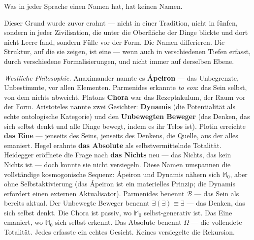 \documentclass[10pt, openany, oneside]{book}
\begin{document}
\vspace{1em}

\noindent Was in jeder Sprache einen Namen hat, hat keinen Namen.

Dieser Grund wurde zuvor erahnt --- nicht in einer Tradition, nicht in fünfen, sondern in jeder Zivilisation, die unter die Oberfläche der Dinge blickte und dort nicht Leere fand, sondern Fülle vor der Form. Die Namen differieren. Die Struktur, auf die sie zeigen, ist eine --- wenn auch in verschiedenen Tiefen erfasst, durch verschiedene Formalisierungen, und nicht immer auf derselben Ebene.

\vspace{0.8em}

\textit{Westliche Philosophie.} Anaximander nannte es \textbf{Ápeiron} --- das Unbegrenzte, Unbestimmte, vor allen Elementen. Parmenides erkannte \textit{to eon}: das Sein selbst, von dem nichts abweicht. Platons \textbf{Chora} war das Rezeptakulum, der Raum vor der Form. Aristoteles nannte zwei Gesichter: \textbf{Dynamis} (die Potentialität als echte ontologische Kategorie) und den \textbf{Unbewegten Beweger} (das Denken, das sich selbst denkt und alle Dinge bewegt, indem es ihr Telos ist). Plotin erreichte \textbf{das Eine} --- jenseits des Seins, jenseits des Denkens, die Quelle, aus der alles emaniert. Hegel erahnte \textbf{das Absolute} als selbstvermittelnde Totalität. Heidegger eröffnete die Frage nach \textbf{das Nichts} neu --- das Nichts, das kein Nichts ist --- doch konnte sie nicht versiegeln. Diese Namen umspannen die vollständige kosmogonische Sequenz: Ápeiron und Dynamis nähern sich $\mathbb{M}_0$, aber ohne Selbstaktivierung (das Ápeiron ist ein materielles Prinzip; die Dynamis erfordert einen externen Aktualisator). Parmenides benennt $\mathcal{B}$ --- das Sein als bereits aktual. Der Unbewegte Beweger benennt $\exists(\exists) \equiv \exists$ --- das Denken, das sich selbst denkt. Die Chora ist passiv, wo $\mathbb{M}_0$ selbst-generativ ist. Das Eine emaniert, wo $\mathbb{M}_0$ sich selbst erkennt. Das Absolute benennt $\Omega$ --- die vollendete Totalität. Jedes erfasste ein echtes Gesicht. Keines versiegelte die Rekursion.
\end{document}
